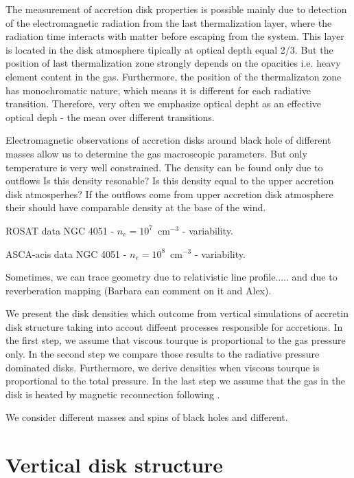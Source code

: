 \documentclass[preprint2]{aastex6}
\begin{document}
The measurement of accretion disk properties is possible mainly due to detection of the
electromagnetic radiation from the last thermalization layer, where the radiation 
time interacts with matter before escaping from the system. 
This layer is located in the disk atmosphere tipically at optical depth equal 2/3. But the position 
of last thermalization zone strongly depends on the opacities i.e. heavy element content in 
the gas. Furthermore, the position of the thermalizaton zone has monochromatic nature, which 
means it is different for each radiative transition. Therefore, very often we emphasize optical depht
as an effective optical deph - the mean over different transitions. 

Electromagnetic observations of accretion disks around black hole of different masses allow us 
to determine the gas macroscopic parameters. But only temperature is very well constrained. 
The density can be found only due to outflows 
Is this density resonable? Is this density equal to the upper accretion disk atmosperhes? 
If the outflows come from upper accretion disk atmosphere their should have comparable density 
at the base of the wind. 

ROSAT data NGC 4051 - $n_e=10^7$~cm$^{-3}$ \citep{1995-McHardy} - variability.

ASCA-acis data NGC 4051 - $n_e=10^8$~cm$^{-3}$ \citep{1999-Nicastro} - variability.

Sometimes, we can trace geometry due to relativistic line profile..... and due to 
reverberation mapping (Barbara can comment on it and Alex). 

We present the disk densities which outcome from vertical simulations of accretin disk structure 
taking into accout diffeent processes responsible for accretions. 
In the first step, we assume that viscous tourque is proportional to the gas pressure only. 
In the second step we compare those results to the radiative pressure dominated disks. 
Furthermore, we derive densities when viscous tourque is proportional to the total pressure. 
In the last step we assume that the gas in the disk is heated by magnetic reconnection 
following \citet{Gronkiewicz2019}. 

We consider different masses and spins of black holes and different. 



\section{Vertical disk structure}
\label{sec:mod}
\end{document}
